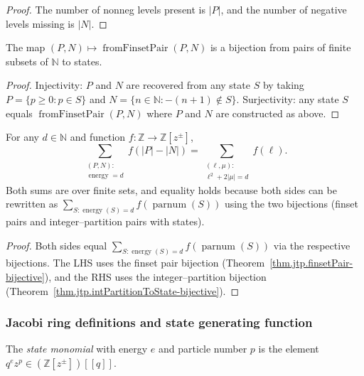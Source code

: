 \begin{proof}
\leanok
The number of nonneg levels present is $|P|$, and the number of
negative levels missing is $|N|$.
\end{proof}

\begin{theorem}
\label{thm.jtp.finsetPair-bijective}
\leanhelper
\leanok
The map $(P,N)\mapsto \operatorname{fromFinsetPair}(P,N)$ is a bijection
from pairs of finite subsets of $\mathbb{N}$ to states.
\end{theorem}

\begin{proof}
\leanok
Injectivity: $P$ and $N$ are recovered from any state $S$ by taking
$P = \{p \geq 0 : p \in S\}$ and $N = \{n \in \mathbb{N} : -(n+1) \notin S\}$.
Surjectivity: any state $S$ equals $\operatorname{fromFinsetPair}(P, N)$
where $P$ and $N$ are constructed as above.
\end{proof}

\begin{lemma}
\label{lem.jtp.finsetPair-sum-eq-partition-sum}
\leanhelper
\leanok
For any $d\in\mathbb{N}$ and function $f:\mathbb{Z}\to\mathbb{Z}[z^{\pm}]$,
\[
\sum_{\substack{(P,N):\\\operatorname{energy}=d}} f(|P|-|N|)
= \sum_{\substack{(\ell,\mu):\\\ell^2+2|\mu|=d}} f(\ell).
\]
Both sums are over finite sets, and equality holds because both sides can
be rewritten as $\sum_{S:\operatorname{energy}(S)=d} f(\operatorname{parnum}(S))$
using the two bijections (finset pairs and integer--partition pairs with states).
\end{lemma}

\begin{proof}
Both sides equal $\sum_{S:\operatorname{energy}(S)=d} f(\operatorname{parnum}(S))$
via the respective bijections.
The LHS uses the finset pair bijection (Theorem~\ref{thm.jtp.finsetPair-bijective}),
and the RHS uses the integer--partition bijection
(Theorem~\ref{thm.jtp.intPartitionToState-bijective}).
\end{proof}

\subsubsection{Jacobi ring definitions and state generating function}

\begin{definition}
\label{def.jtp.stateMonomial}
\leanhelper
\leanok
The \emph{state monomial} with energy $e$ and particle number $p$ is
the element $q^e z^p \in (\mathbb{Z}[z^{\pm}])[[q]]$.
\end{definition}

